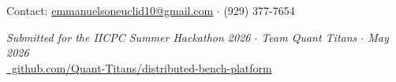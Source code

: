\documentclass[12pt,a4paper]{article}
\begin{document}
\vspace{1em}
\begin{center}
  {\color{muted}\small Contact: \href{mailto:emmanuelsoneuclid10@gmail.com}{emmanuelsoneuclid10@gmail.com}
  $\cdot$ (929) 377-7654}
\end{center}

\vfill
\begin{center}
  \color{muted}\small
  \textit{Submitted for the IICPC Summer Hackathon 2026 $\cdot$ Team Quant Titans $\cdot$ May 2026}\\[4pt]
  \href{https://github.com/Quant-Titans/distributed-bench-platform}{\faGithub\ github.com/Quant-Titans/distributed-bench-platform}
\end{center}
\end{document}
